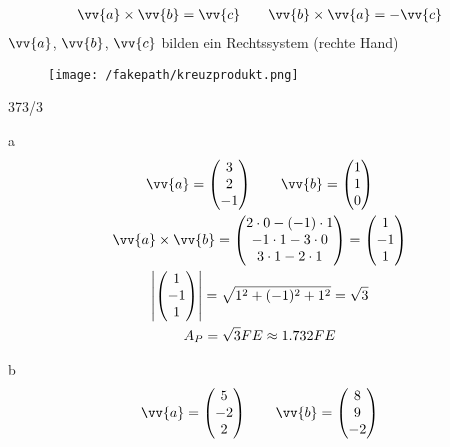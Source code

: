 \newpage
\begin{gather*}
  \vv{a} \times \vv{b} = \vv{c} \qquad \vv{b} \times \vv{a} = -\vv{c}
\end{gather*}
$\vv{a}$, $\vv{b}$, $\vv{c}$ bilden ein Rechtssystem (rechte Hand)
\begin{figure}[H]
  \centering
  \texttt{[image: /fakepath/kreuzprodukt.png]}
\end{figure}
\begin{exercise}{373/3}
  \item [a]
  \begin{gather*}
    \vv{a} = \begin{pmatrix}3 \\ 2 \\ -1\end{pmatrix} \qquad \vv{b} = \begin{pmatrix}1 \\ 1 \\ 0\end{pmatrix} \\
    \vv{a} \times \vv{b} = \begin{pmatrix}2 \cdot 0 - (-1) \cdot 1 \\ -1 \cdot 1 - 3 \cdot 0 \\ 3 \cdot 1 - 2 \cdot 1\end{pmatrix} = \begin{pmatrix}1 \\ -1 \\ 1\end{pmatrix} \\
    \left|\begin{pmatrix}1 \\ -1 \\ 1\end{pmatrix}\right| = \sqrt{1^2 + (-1)^2 + 1^2} = \sqrt{3} \\
    A_P = \sqrt{3}FE \approx 1.732FE
  \end{gather*}
  \item [b]
  \begin{gather*}
    \vv{a} = \begin{pmatrix}5 \\ -2 \\ 2\end{pmatrix} \qquad \vv{b} = \begin{pmatrix}8 \\ 9 \\ -2\end{pmatrix} \\

\end{gather*}
\end{exercise}
